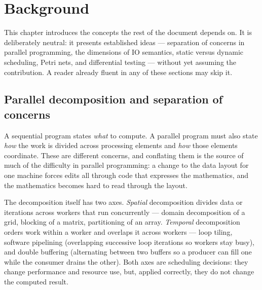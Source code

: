 \chapter{Background}\label{ch:background}

This chapter introduces the concepts the rest of the document depends on. It
is deliberately neutral: it presents established ideas --- separation of
concerns in parallel programming, the dimensions of IO semantics, static versus
dynamic scheduling, Petri nets, and differential testing --- without yet
assuming the contribution. A reader already fluent in any of these sections may
skip it.

\section{Parallel decomposition and separation of concerns}\label{sec:bg-decomp}

A sequential program states \emph{what} to compute. A parallel program must also
state \emph{how} the work is divided across processing elements and \emph{how}
those elements coordinate. These are different concerns, and conflating them is
the source of much of the difficulty in parallel programming: a change to the
data layout for one machine forces edits all through code that expresses the
mathematics, and the mathematics becomes hard to read through the layout.

The decomposition itself has two axes. \emph{Spatial} decomposition divides data
or iterations across workers that run concurrently --- domain decomposition of a
grid, blocking of a matrix, partitioning of an array. \emph{Temporal}
decomposition orders work within a worker and overlaps it across workers ---
loop tiling, software pipelining (overlapping successive loop iterations so
workers stay busy), and double buffering (alternating between two buffers so a
producer can fill one while the consumer drains the other). Both axes are
scheduling decisions: they change performance and resource use, but, applied
correctly, they do not change the computed result.

